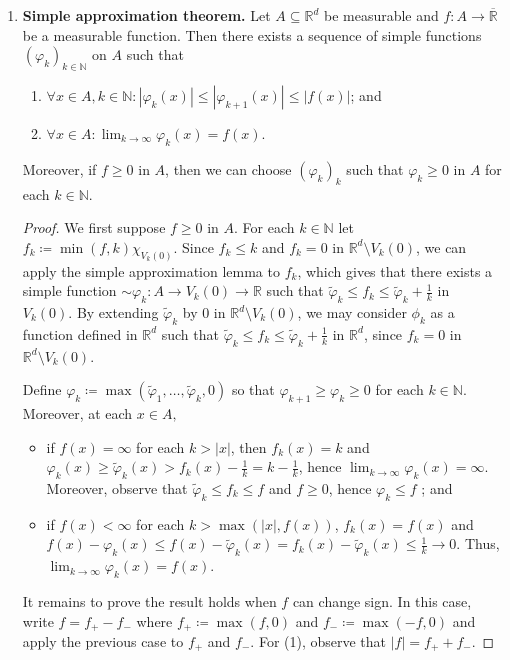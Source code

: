 \begin{enumerate}
\begin{proof}
	\end{proof}
\item \textbf{Simple approximation theorem.} Let \( A \subseteq \mathbb{R}^{d}  \) be measurable and \( f : A \to \overline{\mathbb{R}} \) be a measurable function. Then there exists a sequence of simple functions \( (\varphi _k)_{k \in \mathbb{N} }  \) on \( A \) such that
\begin{enumerate}
	\item \(\forall x \in A, k \in \mathbb{N} : |\varphi _k(x)| \leq |\varphi _{k+1}(x) | \leq |f(x)| \); and
	\item \(\forall x \in A : \lim_{{k} \to {\infty}} \varphi _k(x) = f(x) \).
\end{enumerate}
Moreover, if \( f \geq 0 \) in \( A \), then we can choose \(( \varphi _k )_k\) such that \( \varphi _k \geq 0 \) in \( A \) for each \( k \in \mathbb{N}  \).
\begin{proof}\renewcommand{\qedsymbol}{}
We first suppose \( f \geq 0 \) in \( A \). For each \( k \in \mathbb{N}  \) let \( f_k\coloneqq \min (f,k)\chi_{V_{k} (0)}  \). Since \( f_k \leq k  \) and \( f_k = 0 \) in \( \mathbb{R}^{d} \setminus V_k(0) \), we can apply the simple approximation lemma to \( f_k \), which gives that there exists a simple function \( \sim{\varphi}_k : A \to V_k(0) \to \mathbb{R} \) such that \( \tilde{\varphi}_k \leq f_k \leq \tilde{\varphi}_k + \frac{1}{k}  \) in \( V_k(0). \) By extending \( \tilde{\varphi}_k \) by 0 in \( \mathbb{R}^{d} \setminus V_k(0) \), we may consider \( \phi_k \) as a function defined in \( \mathbb{R}^{d}  \) such that \( \tilde{\varphi}_k \leq f_k \leq \tilde{\varphi}_k + \frac{1}{k}  \) in \( \mathbb{R}^{d}  \), since \( f_k = 0 \) in \( \mathbb{R}^{d} \setminus V_k(0) \).

Define \( \varphi _k \coloneqq \max (\tilde{\varphi}_1, \hdots , \tilde{\varphi}_k , 0) \) so that \( \varphi_{k+1} \geq \varphi _k \geq 0   \) for each \( k \in \mathbb{N}  \). Moreover, at each \(x \in A,\)
\begin{itemize}
	\item if \( f(x) = \infty \) for each \( k > |x| \), then \( f_k(x) = k \) and \( \varphi _k (x) \geq \tilde{\varphi }_k(x) > f_k(x) - \frac{1}{k} = k - \frac{1}{k}  \), hence \( \lim_{{k} \to {\infty}} \varphi _k (x) = \infty \). Moreover, observe that \( \tilde{\varphi }_k \leq f _k \leq f \) and \( f \geq 0 \), hence \( \varphi _k \leq f \)  ; and
	\item if \( f(x) < \infty \) for each \( k > \max (|x|, f(x)) \), \( f_k(x) = f(x) \) and \( f(x) - \varphi _k(x) \leq f(x) - \tilde{\varphi }_k(x) = f_k(x) - \tilde{\varphi}_k(x) \leq \frac{1}{k} \to 0  \). Thus, \( \lim_{{k} \to {\infty}} \varphi _k (x) = f(x) \).
\end{itemize}
It remains to prove the result holds when \( f \) can change sign. In this case, write \( f = f_+ - f_- \) where \( f_+ \coloneqq \max (f , 0) \) and \( f_- \coloneqq  \max(-f,0) \) and apply the previous case to \( f_+ \) and \( f_- \). For (1), observe that \( |f| = f_+ + f_- \).
\end{proof}
\end{enumerate}

